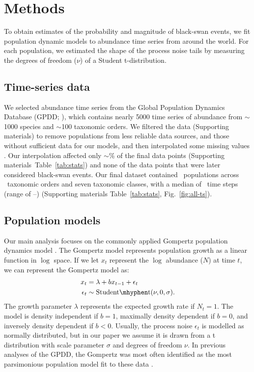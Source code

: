 \section{Methods}

To obtain estimates of the probability and magnitude of black-swan events, we
fit population dynamic models to abundance time series from around the world.
For each population, we estimated the shape of the process noise tails by
measuring the degrees of freedom ($\nu$) of a Student t-distribution.

\subsection{Time-series data}

We selected abundance time series from the Global Population Dynamics Database
(GPDD; \citeauthor{gpdd2010} \citeyear{gpdd2010}), which contains nearly 5000
time series of abundance from $\sim$1000 species and $\sim$100 taxonomic
orders. We filtered the data (Supporting materials) to remove populations
from less reliable data sources, and those without sufficient data for our
models, and then interpolated some missing values
\citep[\textit{sensu}][]{brook2006a}. Our interpolation affected only
$\sim$\interpPointsPerc \% of the final data points (Supporting materials~Table~\ref{tab:stats})
and none of the data points that were later considered black-swan events. Our
final dataset contained \NPops~populations across \NOrders~taxonomic orders
and seven taxonomic classes, with a median of \medianTimeSteps~time steps
(range of \minTimeSteps--\maxTimeSteps) (Supporting materials Table~\ref{tab:stats},
Fig.~\ref{fig:all-ts}).

\subsection{Population models}

Our main analysis focuses on the commonly applied Gompertz population dynamics
model \citep[e.g.][]{knape2012,dennis2014,connors2014}. The Gompertz model
represents population growth as a linear function in $\log$ space. If we let
$x_t$ represent the $\log$ abundance ($N$) at time $t$, we can represent the
Gompertz model as:
\begin{align*}
x_t &= \lambda + b x_{t-1} + \epsilon_t\\
\epsilon_t &\sim \mathrm{Student\mhyphen t}(\nu, 0, \sigma).
\end{align*}
The growth parameter $\lambda$ represents the expected growth rate if $N_t =
1$. The model is density independent if $b = 1$, maximally density dependent
if $b = 0$, and inversely density dependent if $b < 0$. Usually, the process
noise $\epsilon_t$ is modelled as normally distributed, but in our paper we
assume it is drawn from a t distribution with scale parameter $\sigma$ and
degrees of freedom $\nu$. In previous analyses of the GPDD, the Gompertz was
most often identified as the most parsimonious population model fit to these
data \citep{brook2006}.

